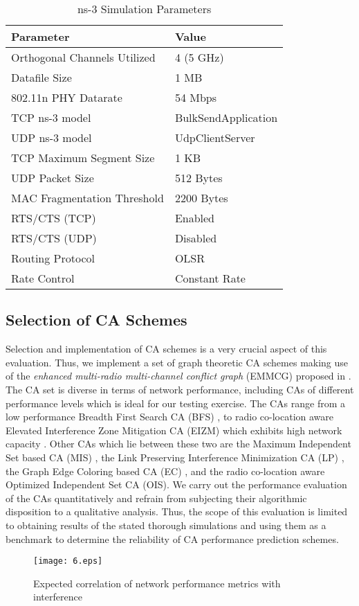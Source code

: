 \documentclass[conference]{IEEEtran}
\begin{document}
 \begin{table} [h!]
\caption{ns-3 Simulation Parameters}
\raggedright
\begin{tabular}{|M{4.5cm}|M{3.5cm}|}
\hline
\bfseries
 Parameter&\bfseries Value \\ [0.2ex]
 \hline
\hline
Orthogonal Channels Utilized & 4 (5 GHz)\\
\hline
Datafile Size & 1 MB  \\
\hline
802.11n PHY Datarate&54 Mbps  \\
\hline
TCP ns-3 model &BulkSendApplication\\
\hline
UDP ns-3 model &UdpClientServer\\
\hline
TCP Maximum Segment Size&1 KB   \\
\hline
UDP Packet Size &512 Bytes\\
\hline
MAC Fragmentation Threshold&2200 Bytes  \\
\hline
RTS/CTS (TCP) & Enabled  \\
\hline
RTS/CTS (UDP) & Disabled \\
\hline
Routing Protocol &OLSR    \\
\hline
Rate Control&Constant Rate   \\
\hline
\end{tabular}
\label{Sim}
\end{table}  

\subsection{Selection of CA Schemes} 
Selection and implementation of CA schemes is a very crucial aspect of this evaluation. Thus, we implement a set of graph theoretic CA schemes making use of the \textit{enhanced multi-radio multi-channel conflict graph} (EMMCG) proposed in \cite{Manas}. The CA set is diverse in terms of network performance, including CAs of different performance levels which is ideal for our testing exercise.
The CAs range from a low performance Breadth First Search CA (BFS) \cite{22Ramachandran}, to radio co-location aware Elevated Interference Zone Mitigation CA (EIZM) which exhibits high network capacity \cite{Manas2}. Other CAs which lie between these two are the Maximum Independent Set based CA (MIS) \cite{24Aizaz}, the Link Preserving Interference Minimization CA (LP) \cite{LP}, the Graph Edge Coloring based CA (EC) \cite{EC}, and the radio co-location aware Optimized Independent Set CA (OIS). 
We carry out the performance evaluation of the CAs quantitatively and refrain from subjecting their algorithmic disposition to a qualitative analysis. Thus, the scope of this evaluation is limited to obtaining results of the stated thorough simulations and using them as a benchmark to determine the reliability of CA performance prediction schemes.
\begin{figure}[htb!]
                \centering
                \texttt{[image: 6.eps]}
                \caption{Expected correlation of network performance metrics with interference}
                \label{cor}
        \end{figure}
\end{document}
